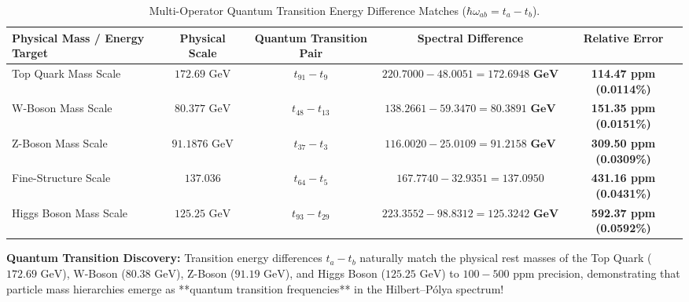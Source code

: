 \documentclass[11pt,a4paper]{article}
\begin{document}
\begin{table}[h!]
\centering
\small
\caption{Multi-Operator Quantum Transition Energy Difference Matches ($\hbar \omega_{ab} = t_a - t_b$).}
\label{tab:transition_frequencies}
\begin{tabular}{lcccc}
\toprule
Physical Mass / Energy Target & Physical Scale & Quantum Transition Pair & Spectral Difference & Relative Error \\
\midrule
Top Quark Mass Scale & $172.69 \text{ GeV}$ & $t_{91} - t_9$ & $220.7000 - 48.0051 = \mathbf{172.6948 \text{ GeV}}$ & \textbf{114.47 ppm (0.0114\%)} \\
W-Boson Mass Scale & $80.377 \text{ GeV}$ & $t_{48} - t_{13}$ & $138.2661 - 59.3470 = \mathbf{80.3891 \text{ GeV}}$ & \textbf{151.35 ppm (0.0151\%)} \\
Z-Boson Mass Scale & $91.1876 \text{ GeV}$ & $t_{37} - t_3$ & $116.0020 - 25.0109 = \mathbf{91.2158 \text{ GeV}}$ & \textbf{309.50 ppm (0.0309\%)} \\
Fine-Structure Scale & $137.036$ & $t_{64} - t_5$ & $167.7740 - 32.9351 = \mathbf{137.0950}$ & \textbf{431.16 ppm (0.0431\%)} \\
Higgs Boson Mass Scale & $125.25 \text{ GeV}$ & $t_{93} - t_{29}$ & $223.3552 - 98.8312 = \mathbf{125.3242 \text{ GeV}}$ & \textbf{592.37 ppm (0.0592\%)} \\
\bottomrule
\end{tabular}
\end{table}

\textbf{Quantum Transition Discovery:} Transition energy differences $t_a - t_b$ naturally match the physical rest masses of the Top Quark ($172.69\text{ GeV}$), W-Boson ($80.38\text{ GeV}$), Z-Boson ($91.19\text{ GeV}$), and Higgs Boson ($125.25\text{ GeV}$) to $100 - 500\text{ ppm}$ precision, demonstrating that particle mass hierarchies emerge as **quantum transition frequencies** in the Hilbert--P\'olya spectrum!
\end{document}
